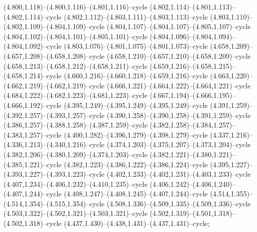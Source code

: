 (4.800,1.118)--(4.800,1.116)--(4.801,1.116)--cycle (4.802,1.114)--(4.801,1.113)--(4.802,1.114)--cycle (4.802,1.112)--(4.803,1.111)--(4.803,1.113)--cycle (4.803,1.110)--(4.802,1.109)--(4.804,1.109)--cycle (4.804,1.107)--(4.804,1.107)--(4.805,1.107)--cycle (4.804,1.102)--(4.804,1.101)--(4.805,1.101)--cycle (4.804,1.096)--(4.804,1.094)--(4.804,1.092)--cycle (4.803,1.076)--(4.801,1.075)--(4.801,1.073)--cycle (4.658,1.209)--(4.657,1.208)--(4.658,1.208)--cycle (4.658,1.210)--(4.657,1.210)--(4.658,1.209)--cycle (4.658,1.213)--(4.658,1.212)--(4.658,1.211)--cycle (4.659,1.216)--(4.658,1.215)--(4.658,1.214)--cycle (4.660,1.216)--(4.660,1.218)--(4.659,1.216)--cycle (4.663,1.220)--(4.662,1.219)--(4.662,1.219)--cycle (4.666,1.221)--(4.664,1.222)--(4.664,1.221)--cycle (4.684,1.222)--(4.682,1.223)--(4.681,1.223)--cycle (4.667,1.194)--(4.666,1.195)--(4.666,1.192)--cycle (4.395,1.249)--(4.395,1.249)--(4.395,1.249)--cycle (4.391,1.259)--(4.392,1.257)--(4.393,1.257)--cycle (4.390,1.258)--(4.390,1.258)--(4.391,1.259)--cycle (4.386,1.257)--(4.388,1.258)--(4.387,1.259)--cycle (4.382,1.258)--(4.384,1.257)--(4.383,1.257)--cycle (4.400,1.282)--(4.396,1.279)--(4.398,1.279)--cycle (4.337,1.216)--(4.336,1.213)--(4.340,1.216)--cycle (4.374,1.203)--(4.375,1.207)--(4.373,1.204)--cycle (4.382,1.206)--(4.380,1.209)--(4.374,1.203)--cycle (4.382,1.221)--(4.380,1.221)--(4.385,1.221)--cycle (4.382,1.223)--(4.386,1.222)--(4.386,1.224)--cycle (4.395,1.227)--(4.393,1.227)--(4.393,1.223)--cycle (4.402,1.233)--(4.402,1.231)--(4.403,1.233)--cycle (4.407,1.234)--(4.406,1.232)--(4.410,1.235)--cycle (4.406,1.242)--(4.406,1.240)--(4.407,1.244)--cycle (4.408,1.247)--(4.408,1.245)--(4.407,1.244)--cycle (4.514,1.355)--(4.514,1.354)--(4.515,1.354)--cycle (4.508,1.336)--(4.509,1.335)--(4.509,1.336)--cycle (4.503,1.322)--(4.502,1.321)--(4.503,1.321)--cycle (4.502,1.319)--(4.501,1.318)--(4.502,1.318)--cycle (4.437,1.430)--(4.438,1.431)--(4.437,1.431)--cycle;
